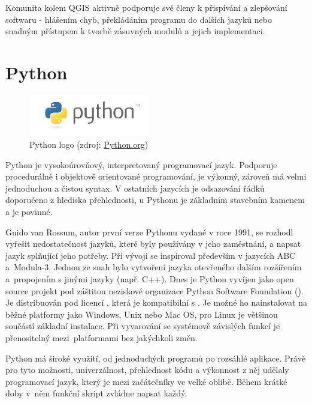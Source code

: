 Komunita kolem QGIS aktivně podporuje své členy k přispívání a
zlepšování softwaru - hlášením chyb, překládáním programu do dalších
jazyků nebo snadným přístupem k tvorbě zásuvných modulů a jejich
implementaci.


\section{Python}

\begin{figure}[H] \centering
      \includegraphics[width=150pt]{./pictures/python-logo-master-v3-TM.png}
      \caption[Python logo]{Python logo (zdroj:
\href{https://www.python.org/static/community_logos/python-logo-master-v3-TM.png}{Python.org})}
      \label{fig:python}
  \end{figure}
  
Python je vysokoúrovňový, interpretovaný programovací jazyk. Podporuje
procedurálně i objektově orientované programování, je výkonný, zároveň
má velmi jednoduchou a čistou syntax. V ostatních jazycích je
odsazování řádků doporučeno z hlediska přehlednosti, u Pythonu je
základním stavebním kamenem a je povinné.

Guido van Rossum, autor první verze Pythonu vydané v roce 1991, se
rozhodl vyřešit nedostatečnost jazyků, které byly používány v jeho
zaměstnání, a napsat jazyk splňující jeho potřeby. Při vývoji se
inspiroval především v jazycích ABC a~Modula-3. Jednou ze snah bylo
vytvoření jazyka otevřeného dalším rozšířením a~propojením s jinými
jazyky (např. C++). Dnes je Python vyvíjen jako open source projekt
pod záštitou neziskové organizace Python Software Foundation
(). Je distribuován pod licencí , která je
kompatibilní s . Je možné ho nainstalovat na běžné platformy
jako Windows, Unix nebo Mac OS, pro Linux je většinou součástí
základní instalace. Při vyvarování se systémově závislých funkcí je
přenositelný mezi~platformami bez jakýchkoli změn.

Python má široké využití, od jednoduchých programů po rozsáhlé
aplikace. Právě pro tyto možnosti, univerzálnost, přehlednost kódu a
výkonnost z něj udělaly programovací jazyk, který je mezi začátečníky ve
velké oblibě. Během krátké doby v~něm funkční skript zvládne napsat
každý.
  
